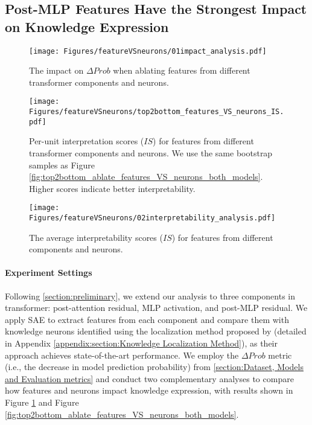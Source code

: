 \subsection{Post-MLP Features Have the Strongest Impact on Knowledge Expression}
\label{subsection:Post-MLP Features Have the Strongest Impact on Knowledge Expression}

\begin{figure}
    \centering
    \texttt{[image: Figures/featureVSneurons/01impact\_analysis.pdf]}
\caption{The impact on $\Delta Prob$ when ablating features from different transformer components and neurons.}
    \label{fig:featureVSneurons_overall_Prob}
\end{figure}


\begin{figure*}
    \centering
    \texttt{[image: Figures/featureVSneurons/top2bottom\_features\_VS\_neurons\_IS.pdf]}
\caption{Per-unit interpretation scores ($IS$) for features from different transformer components and neurons. We use the same bootstrap samples as Figure \ref{fig:top2bottom_ablate_features_VS_neurons_both_models}. Higher scores indicate better interpretability.}
    \label{fig:top2bottom_features_VS_neurons_IS}
\end{figure*}

\begin{figure}
    \centering
    \texttt{[image: Figures/featureVSneurons/02interpretability\_analysis.pdf]}
\caption{The average interpretability scores ($IS$) for features from different components and neurons.}
\label{fig:featureVSneurons_overall_IS}
\end{figure}
\paragraph{Experiment Settings}
Following \textsection\ref{section:preliminary}, we extend our analysis to three components in transformer: post-attention residual, MLP activation, and post-MLP residual.
We apply SAE to extract features from each component and compare them with knowledge neurons identified using the localization method proposed by \citet{chen2024journey} (detailed in Appendix \ref{appendix:section:Knowledge Localization Method}), as their approach achieves state-of-the-art performance. We employ the $\Delta Prob$ metric (i.e., the decrease in model prediction probability) from \textsection\ref{section:Dataset, Models and Evaluation metrics} and conduct two complementary analyses to compare how features and neurons impact knowledge expression, with results shown in Figure \ref{fig:featureVSneurons_overall_Prob} and Figure \ref{fig:top2bottom_ablate_features_VS_neurons_both_models}.


